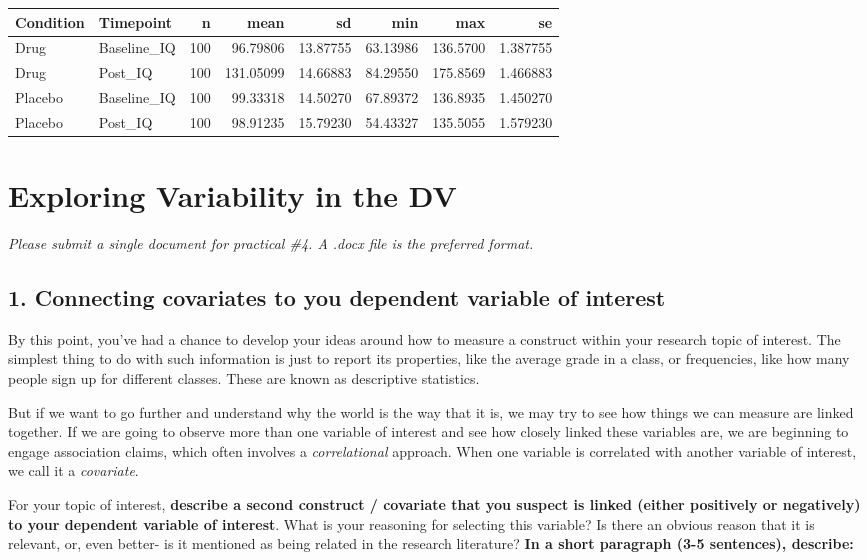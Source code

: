 \documentclass[
]{book}
\begin{document}
\begin{tabular}{l|l|r|r|r|r|r|r}
\hline
Condition & Timepoint & n & mean & sd & min & max & se\\
\hline
Drug & Baseline\_IQ & 100 & 96.79806 & 13.87755 & 63.13986 & 136.5700 & 1.387755\\
\hline
Drug & Post\_IQ & 100 & 131.05099 & 14.66883 & 84.29550 & 175.8569 & 1.466883\\
\hline
Placebo & Baseline\_IQ & 100 & 99.33318 & 14.50270 & 67.89372 & 136.8935 & 1.450270\\
\hline
Placebo & Post\_IQ & 100 & 98.91235 & 15.79230 & 54.43327 & 135.5055 & 1.579230\\
\hline
\end{tabular}

\chapter{Exploring Variability in the DV}\label{exploring-variability-in-the-dv}

\emph{Please submit a single document for practical \#4. A .docx file is the preferred format.}

\section*{1. Connecting covariates to you dependent variable of interest}\label{connecting-covariates-to-you-dependent-variable-of-interest}

By this point, you've had a chance to develop your ideas around how to measure a construct within your research topic of interest. The simplest thing to do with such information is just to report its properties, like the average grade in a class, or frequencies, like how many people sign up for different classes. These are known as descriptive statistics.

But if we want to go further and understand why the world is the way that it is, we may try to see how things we can measure are linked together. If we are going to observe more than one variable of interest and see how closely linked these variables are, we are beginning to engage association claims, which often involves a \emph{correlational} approach. When one variable is correlated with another variable of interest, we call it a \emph{covariate}.

For your topic of interest, \textbf{describe a second construct / covariate that you suspect is linked (either positively or negatively) to your dependent variable of interest}. What is your reasoning for selecting this variable? Is there an obvious reason that it is relevant, or, even better- is it mentioned as being related in the research literature? \textbf{In a short paragraph (3-5 sentences), describe:}
\end{document}
